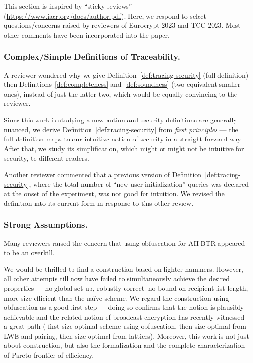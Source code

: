 This section is inspired by ``sticky reviews''
(\url{https://www.iacr.org/docs/author.pdf}).
Here, we respond to select questions/concerns raised by reviewers
of Euro\-crypt 2023 and TCC 2023.
Most other comments have been incorporated into the paper.

\subsubsection{Complex/Simple Definitions of Traceability.}
A reviewer wondered why we give
Definition~\ref{def:tracing-security} (full definition)
then Definitions~\ref{def:completeness} and~\ref{def:soundness}
(two equivalent smaller ones),
instead of just the latter two,
which would be equally convincing to the reviewer.

Since this work is studying a new notion and
security definitions are generally nuanced,
we derive Definition~\ref{def:tracing-security}
from \emph{first principles} ---
the full definition maps to our intuitive notion of security
in a straight-forward way.
After that, we study its simplification,
which might or might not be intuitive for security,
to different readers.

Another reviewer commented that
a previous version of Definition~\ref{def:tracing-security},
where the total number of ``new user initialization'' queries
was declared at the onset of the experiment,
was not good for intuition.
We revised the definition into its current form
in response to this other review.

\subsubsection{Strong Assumptions.}
Many reviewers raised the concern
that using obfuscation for AH-BTR appeared to be an overkill.

We would be thrilled to find a construction based on lighter hammers.
However, all other attempts till now have failed
to simultaneously achieve the desired properties ---
no global set-up,
robustly correct,
no bound on recipient list length,
more size-efficient than the na\"ive scheme.
We regard the construction using obfuscation as a good first step ---
doing so confirms that the notion is plausibly achievable and
the related notion of broadcast encryption has recently witnessed a great path
(\cite{C:BonWatZha14} first size-optimal scheme using obfuscation, then
\cite{EC:AgrYam20,TCC:AgrWicYam20} size-optimal from LWE and pairing, then
\cite{EC:Wee22} size-optimal from lattices).
Moreover, this work is not just about construction,
but also the formalization and
the complete characterization of Pareto frontier of efficiency.
